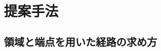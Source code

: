 \chapter{提案手法}
  \label{chap:method}
  \section{領域と端点を用いた経路の求め方}
    \label{sec:the way of the route}
